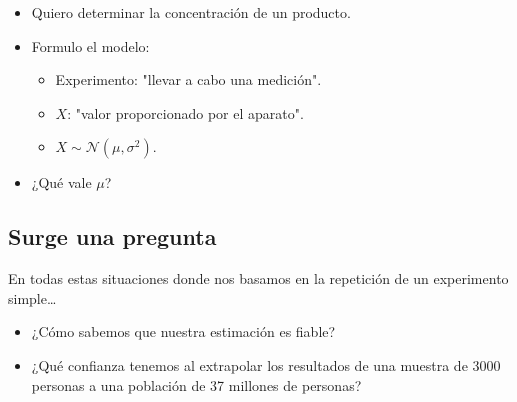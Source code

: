 \begin{tcolorbox}[colback=blue!5!white, colframe=blue!75!black, title=Determinación de la concentración de un producto]
\begin{itemize}[label=\textbullet]
    \item Quiero determinar la concentración de un producto.
    \item Formulo el modelo:
        \begin{itemize}[label=\textrightarrow]
            \item Experimento: "llevar a cabo una medición".
            \item $X$: "valor proporcionado por el aparato".
            \item  $X\sim \mathcal{N}(\mu,\sigma^2)$.
        \end{itemize}
    \item ¿Qué vale $\mu$?
\end{itemize}
\end{tcolorbox}
\subsection{Surge una pregunta}
En todas estas situaciones donde nos basamos en la repetición de un experimento simple\dots
\begin{itemize}[label=\textbullet]
    \item ¿Cómo sabemos que nuestra estimación es fiable?
    \item ¿Qué confianza tenemos al extrapolar los resultados de una muestra de 3000 personas a una población de 37 millones de personas?
\end{itemize}
